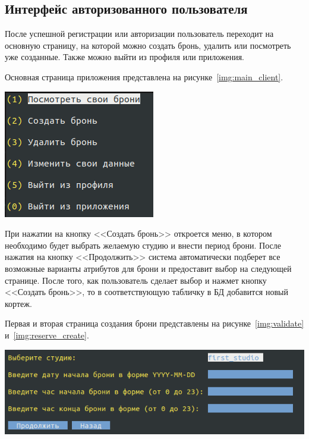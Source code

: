 \subsection{Интерфейс авторизованного пользователя}
После успешной регистрации или авторизации пользователь переходит на основную страницу, на которой можно создать бронь, удалить или посмотреть уже созданные.
Также можно выйти из профиля или приложения.

Основная страница приложения представлена на рисунке~\ref{img:main_client}.

\begin{center}
	\centering
	\includegraphics[height=0.3\textheight]{inc/img/main_client.png}
	\label{img:main_client}
\end{center}


При нажатии на кнопку <<Создать бронь>> откроется меню, в котором необходимо будет выбрать желаемую студию и внести период брони.
После нажатия на кнопку <<Продолжить>> система автоматически подберет все возможные варианты атрибутов для брони и предоставит выбор на следующей странице.
После того, как пользователь сделает выбор и нажмет кнопку <<Создать бронь>>, то в соответствующую табличку в БД добавится новый кортеж.

Первая и вторая страница создания брони представлены на рисунке~\ref{img:validate} и~\ref{img:reserve_create}.

\begin{center}
	\centering
	\includegraphics[height=0.105\textheight]{inc/img/validate.png}
	\label{img:validate}
\end{center}


